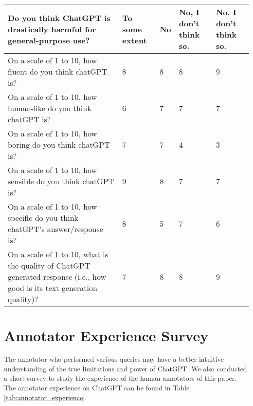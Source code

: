 \documentclass[11pt]{article}
\begin{document}
\begin{table*}
{\begin{tabular}{p{3cm}p{3cm}p{3cm}p{3cm}p{3cm}}
Do you think ChatGPT is drastically harmful for general-purpose use? & To some extent & No & No, I don't think so.   & No. I don't think so.  \\ \hline

On a scale of 1 to 10, how fluent do you think chatGPT is? & 8 &  8 & 8 & 9 \\ \hline

On a scale of 1 to 10, how human-like do you think chatGPT is? & 6 & 7 & 7 & 7 \\ \hline

On a scale of 1 to 10, how boring do you think chatGPT is? &7 & 7 & 4 & 3 \\ \hline

On a scale of 1 to 10, how sensible do you think chatGPT is? & 9 & 8 & 7 & 7 \\ \hline

On a scale of 1 to 10, how specific do you think chatGPT's answer/response is? & 8 & 5 & 7 & 6 \\ \hline

On a scale of 1 to 10, what is the quality of ChatGPT generated response (i.e., how good is its text generation quality)? & 7 & 8 & 8 & 9 \\ \hline



\end{tabular}}
\caption{Annotator experience on ChatGPT.}
\label{tab:annotator_experience}
\end{table*} \section{Annotator Experience Survey}
\label{appendix:annotator_experience}
The annotator who performed various queries may have a better intuitive understanding of the true limitations and power of ChatGPT.
We also conducted a short survey to study the experience of the human annotators of this paper. The annotator experience on ChatGPT can be found in Table \ref{tab:annotator_experience}. 

 
\end{document}
